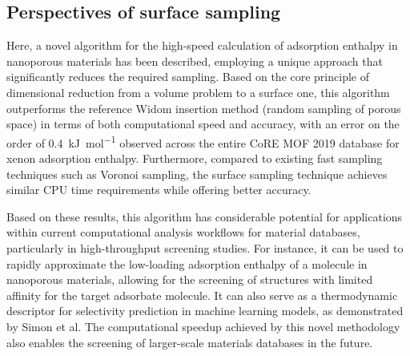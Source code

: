 \documentclass[main]{subfiles}
\begin{document}
\subsection{Perspectives of surface sampling}

Here, a novel algorithm for the high-speed calculation of adsorption enthalpy in nanoporous materials has been described, employing a unique approach that significantly reduces the required sampling. Based on the core principle of dimensional reduction from a volume problem to a surface one, this algorithm outperforms the reference Widom insertion method (random sampling of porous space) in terms of both computational speed and accuracy, with an error on the order of \SI{0.4}{\kilo\joule\per\mole} observed across the entire CoRE MOF 2019 database for xenon adsorption enthalpy. Furthermore, compared to existing fast sampling techniques such as Voronoi sampling, the surface sampling technique achieves similar CPU time requirements while offering better accuracy.

Based on these results, this algorithm has considerable potential for applications within current computational analysis workflows for material databases, particularly in high-throughput screening studies. For instance, it can be used to rapidly approximate the low-loading adsorption enthalpy of a molecule in nanoporous materials, allowing for the screening of structures with limited affinity for the target adsorbate molecule. It can also serve as a thermodynamic descriptor for selectivity prediction in machine learning models, as demonstrated by Simon et al.\autocite{Simon_2015} The computational speedup achieved by this novel methodology also enables the screening of larger-scale materials databases in the future.
\end{document}
